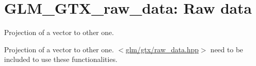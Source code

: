 \hypertarget{group__gtx__raw__data}{\section{\-G\-L\-M\-\_\-\-G\-T\-X\-\_\-raw\-\_\-data\-: \-Raw data}
\label{group__gtx__raw__data}
}


\-Projection of a vector to other one.  


\-Projection of a vector to other one. $<$\hyperlink{raw__data_8hpp}{glm/gtx/raw\-\_\-data.\-hpp}$>$ need to be included to use these functionalities. 